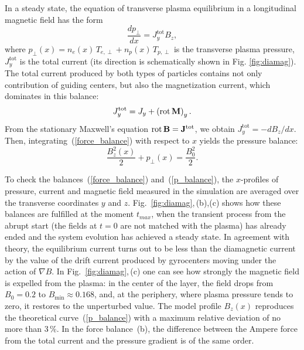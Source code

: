 \documentclass[final,3p]{elsarticle}
\newcommand{\rot}{\mbox{\rm{rot\,}}}
\begin{document}
In a steady state, the equation of transverse plasma equilibrium in a longitudinal magnetic field has the form
\begin{equation}\label{force_balance}
    \frac{dp_\perp}{dx}=J_y^{\text{tot}}B_z,
\end{equation}
where $p_\perp(x)=n_e(x)\,T_{e,\perp}+n_p(x)\,T_{p,\perp}$ is the transverse plasma pressure, $J_y^{\text{tot}}$ is the total current (its direction is schematically shown in Fig. \ref{fig:diamag}). The total current produced by both types of particles contains not only contribution of guiding centers, but also the magnetization current, which dominates in this balance:
\begin{equation}\label{Jtot}
    J_y^{\text{tot}}=J_y+\left(\rot{\bf M}\right)_y.
\end{equation}
From the stationary Maxwell's equation $\rot{\bf B}={\bf J}^{\text{tot}}$, we obtain $J_y^{\text{tot}}=-dB_z/dx$. Then, integrating~(\ref{force_balance}) with respect to $x$ yields the pressure balance:
\begin{equation}\label{p_balance}
    \frac{B_z^2(x)}{2}+p_\perp(x)=\frac{B_0^2}{2}.
\end{equation}

To check the balances~(\ref{force_balance}) and~(\ref{p_balance}), the $x$-profiles of pressure, current and magnetic field measured in the simulation are averaged over the transverse coordinates $y$ and $z$. Fig.~\ref{fig:diamag},\,(b),(c) shows how these balances are fulfilled at the moment $t_{max}$, when the transient process from the abrupt start (the fields at $t=0$ are not matched with the plasma) has already ended and the system evolution has achieved a steady state. In agreement with theory, the equilibrium current turns out to be less than the diamagnetic current by the value of the drift current produced by gyrocenters moving under the action of $\nabla B$.
In Fig.~\ref{fig:diamag},\,(c) one can see how strongly the magnetic field is expelled from the plasma:  in the center of the layer, the field drops from $B_0=0.2$ to $B_{\min}\approx0.168$, and, at the periphery, where plasma pressure tends to zero, it restores to the unperturbed value. The model profile $B_z(x)$ reproduces the theoretical curve~(\ref{p_balance}) with a maximum relative deviation of no more than $3\,\%$. In the force balance~(b), the difference between the Ampere force from the total current and the pressure gradient is of the same order.
\end{document}
